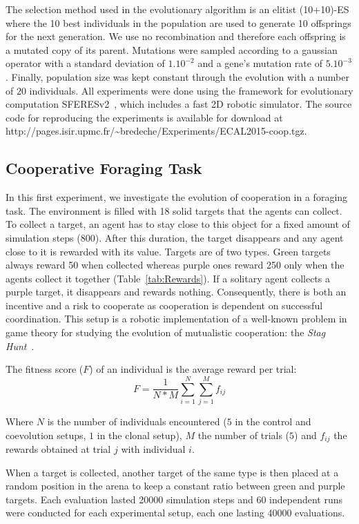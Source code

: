   The selection method used in the evolutionary algorithm is an elitist (10+10)-ES where the 10 best individuals in the population are used to generate 10 offsprings for the next generation. We use no recombination and therefore each offspring is a mutated copy of its parent. Mutations were sampled according to a gaussian operator with a standard deviation of \(1.10^{-2}\) and a gene's mutation rate of \(5.10^{-3}\). Finally, population size was kept constant through the evolution with a number of $20$ individuals. All experiments were done using the framework for evolutionary computation SFERESv2~\cite{Mouret2010}, which includes a fast 2D robotic simulator. The source code for reproducing the experiments is available for download at http://pages.isir.upmc.fr/\textasciitilde bredeche/Experiments/ECAL2015-coop.tgz.


  \subsection{Cooperative Foraging Task}
  
  In this first experiment, we investigate the evolution of cooperation in a foraging task. The environment is filled with 18 solid targets that the agents can collect. To collect a target, an agent has to stay close to this object for a fixed amount of simulation steps (800). After this duration, the target disappears and any agent close to it is rewarded with its value. Targets are of two types. Green targets always reward 50 when collected whereas purple ones reward 250 only when the agents collect it together (Table~\ref{tab:Rewards}). If a solitary agent collects a purple target, it disappears and rewards nothing. Consequently, there is both an incentive and a risk to cooperate as cooperation is dependent on successful coordination. This setup is a robotic implementation of a well-known problem in game theory for studying the evolution of mutualistic cooperation: the {\em Stag Hunt}~\cite{Skyrms2004}.

  The fitness score (\(F\)) of an individual is the average reward per trial:
 \[
  F = \frac{1}{N*M} \sum_{i=1}^{N} \sum_{j=1}^{M} f_{ij}
  \]
  
  Where \(N\) is the number of individuals encountered ($5$ in the control and coevolution setups, $1$ in the clonal setup), \(M\) the number of trials ($5$) and \(f_{ij}\) the rewards obtained at trial \(j\) with individual \(i\).

  When a target is collected, another target of the same type is then placed at a random position in the arena to keep a constant ratio between green and purple targets. Each evaluation lasted 20000 simulation steps and 60 independent runs were conducted for each experimental setup, each one lasting 40000 evaluations.

